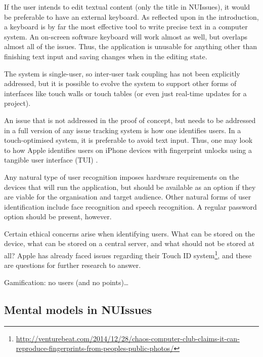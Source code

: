 If the user intends to edit textual content (only the title in NUIssues), it would be preferable to have an external keyboard. As reflected upon in the introduction, a keyboard is by far the most effective tool to write precise text in a computer system. An on-screen software keyboard will work almost as well, but overlaps almost all of the issues. Thus, the application is unusable for anything other than finishing text input and saving changes when in the editing state.

The system is single-user, so inter-user task coupling \autocite[39]{wigdow-wixon:brave-nui-world:2011} has not been explicitly addressed, but it is possible to evolve the system to support other forms of interfaces like touch walls or touch tables (or even just real-time updates for a project). 


An issue that is not addressed in the proof of concept, but needs to be addressed in a full version of any issue tracking system is how one identifies users. In a touch-optimised system, it is preferable to avoid text input. Thus, one may look to how Apple identifies users on iPhone devices with fingerprint unlocks using a tangible user interface (TUI) \autocite{ishii-ullmer:tangible-bits-towards-seamless-interfaces-between-people-bits-and-atoms:1997}.

Any natural type of user recognition imposes hardware requirements on the devices that will run the application, but should be available as an option if they are viable for the organisation and target audience. Other natural forms of user identification include face recognition and speech recognition. A regular password option should be present, however.

Certain ethical concerns arise when identifying users. What can be stored on the device, what can be stored on a central server, and what should not be stored at all? Apple has already faced issues regarding their Touch ID system\footnote{\url{http://venturebeat.com/2014/12/28/chaos-computer-club-claims-it-can-reproduce-fingerprints-from-peoples-public-photos/}}, and these are questions for further research to answer.


Gamification: no users (and no points)\dots %

\subsection{Mental models in NUIssues}

